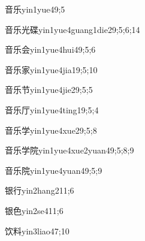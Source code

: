 \begin{verbete}{音乐}{yin1yue4}{9;5}
\end{verbete}

\begin{verbete}{音乐光碟}{yin1yue4guang1die2}{9;5;6;14}
\end{verbete}

\begin{verbete}{音乐会}{yin1yue4hui4}{9;5;6}
\end{verbete}

\begin{verbete}{音乐家}{yin1yue4jia1}{9;5;10}
\end{verbete}

\begin{verbete}{音乐节}{yin1yue4jie2}{9;5;5}
\end{verbete}

\begin{verbete}{音乐厅}{yin1yue4ting1}{9;5;4}
\end{verbete}

\begin{verbete}{音乐学}{yin1yue4xue2}{9;5;8}
\end{verbete}

\begin{verbete}{音乐学院}{yin1yue4xue2yuan4}{9;5;8;9}
\end{verbete}

\begin{verbete}{音乐院}{yin1yue4yuan4}{9;5;9}
\end{verbete}

\begin{verbete}{银行}{yin2hang2}{11;6}
\end{verbete}

\begin{verbete}{银色}{yin2se4}{11;6}
\end{verbete}

\begin{verbete}{饮料}{yin3liao4}{7;10}
\end{verbete}

